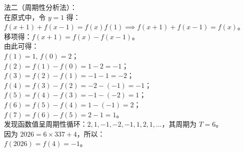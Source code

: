 {  法二（周期性分析法）：\\
  在原式中，令 \(y = 1\) 得：\\
  \(f(x+1) + f(x-1) = f(x)f(1) \implies f(x+1) + f(x-1) = f(x)\)。\\
  移项得：\(f(x+1) = f(x) - f(x-1)\)。\\
  由此可得：\\
  \(f(1) = 1\), \(f(0) = 2\)；\\
  \(f(2) = f(1) - f(0) = 1 - 2 = -1\)；\\
  \(f(3) = f(2) - f(1) = -1 - 1 = -2\)；\\
  \(f(4) = f(3) - f(2) = -2 - (-1) = -1\)；\\
  \(f(5) = f(4) - f(3) = -1 - (-2) = 1\)；\\
  \(f(6) = f(5) - f(4) = 1 - (-1) = 2\)；\\
  \(f(7) = f(6) - f(5) = 2 - 1 = 1\)。\\
  发现函数值呈周期性循环：\(2, 1, -1, -2, -1, 1, 2, 1, \dots\)，其周期为 \(T = 6\)。\\
  因为 \(2026 = 6 \times 337 + 4\)，所以：\\
  \(f(2026) = f(4) = -1\)。%
}

